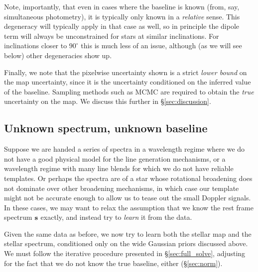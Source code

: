 \documentclass[modern]{aastex631}
\begin{document}
Note, importantly, that even in cases where the baseline is known (from, say, simultaneous photometry), it is typically only known in a \emph{relative} sense. 
This degeneracy will typically apply in that case as well, so in principle the dipole term will always be unconstrained for stars at similar inclinations. 
For inclinations closer to $90^\circ$ this is much less of an issue, although (as we will see below) other degeneracies show up.

Finally, we note that the pixelwise uncertainty shown is a strict \emph{lower bound} on the map uncertainty, since it is the uncertainty conditioned on the inferred value of the baseline. 
Sampling methods such as MCMC are required to obtain the \emph{true} uncertainty on the map. 
We discuss this further in \S\ref{sec:discussion}.

\subsection{Unknown spectrum, unknown baseline}
\label{sec:spot_y1bs}
%
Suppose we are handed a series of spectra in a wavelength regime where we do not have a good physical model for the line generation mechanisms, or a wavelength regime with many line blends for which we do not have reliable templates. 
Or perhaps the spectra are of a star whose rotational broadening does not dominate over other broadening mechanisms, in which case our template might not be accurate enough to allow us to tease out the small Doppler signals. 
In these cases, we may want to relax the assumption that we know the rest frame spectrum ${\mathbf{s}}$ exactly, and instead try to \emph{learn} it from the data.

Given the same data as before, we now try to learn both the stellar map and the stellar spectrum, conditioned only on the wide Gaussian priors discussed above. 
We must follow the iterative procedure presented in
\S\ref{sec:full_solve}, adjusting for the fact that we do not know the true baseline, either (\S\ref{sec:norm}).

\end{document}
